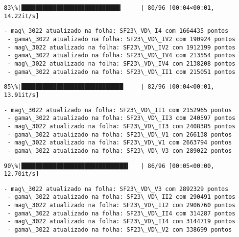 \documentclass[11pt]{article}
\begin{document}
    \begin{Verbatim}[commandchars=\\\{\}]
 83\%|████████████████████████████▎     | 80/96 [00:04<00:01, 14.22it/s]
    \end{Verbatim}

    \begin{Verbatim}[commandchars=\\\{\}]
 - mag\_3022 atualizado na folha: SF23\_VD\_I4 com 1664435 pontos
 - gama\_3022 atualizado na folha: SF23\_VD\_IV2 com 190924 pontos
 - mag\_3022 atualizado na folha: SF23\_VD\_IV2 com 1912199 pontos
 - gama\_3022 atualizado na folha: SF23\_VD\_IV4 com 213554 pontos
 - mag\_3022 atualizado na folha: SF23\_VD\_IV4 com 2138208 pontos
 - gama\_3022 atualizado na folha: SF23\_VD\_II1 com 215051 pontos
    \end{Verbatim}

    \begin{Verbatim}[commandchars=\\\{\}]
 85\%|█████████████████████████████     | 82/96 [00:04<00:01, 13.91it/s]
    \end{Verbatim}

    \begin{Verbatim}[commandchars=\\\{\}]
 - mag\_3022 atualizado na folha: SF23\_VD\_II1 com 2152965 pontos
 - gama\_3022 atualizado na folha: SF23\_VD\_II3 com 240597 pontos
 - mag\_3022 atualizado na folha: SF23\_VD\_II3 com 2408385 pontos
 - gama\_3022 atualizado na folha: SF23\_VD\_V1 com 266138 pontos
 - mag\_3022 atualizado na folha: SF23\_VD\_V1 com 2663794 pontos
 - gama\_3022 atualizado na folha: SF23\_VD\_V3 com 289022 pontos
    \end{Verbatim}

    \begin{Verbatim}[commandchars=\\\{\}]
 90\%|██████████████████████████████▍   | 86/96 [00:05<00:00, 12.70it/s]
    \end{Verbatim}

    \begin{Verbatim}[commandchars=\\\{\}]
 - mag\_3022 atualizado na folha: SF23\_VD\_V3 com 2892329 pontos
 - gama\_3022 atualizado na folha: SF23\_VD\_II2 com 290491 pontos
 - mag\_3022 atualizado na folha: SF23\_VD\_II2 com 2906760 pontos
 - gama\_3022 atualizado na folha: SF23\_VD\_II4 com 314287 pontos
 - mag\_3022 atualizado na folha: SF23\_VD\_II4 com 3144719 pontos
 - gama\_3022 atualizado na folha: SF23\_VD\_V2 com 338699 pontos
    \end{Verbatim}
\end{document}

